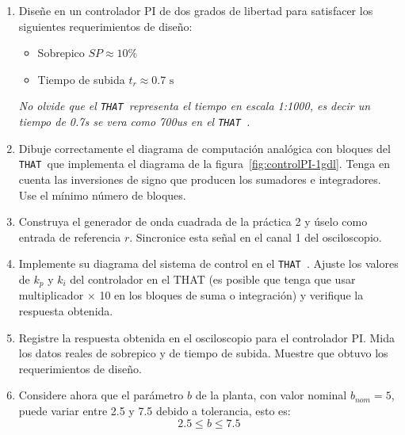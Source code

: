 \documentclass[]{scrartcl}
\newcommand{\that}[0]{\texttt{THAT~}}
\begin{document}
\begin{enumerate}
	\item Diseñe en un controlador PI de dos grados de libertad para satisfacer los siguientes requerimientos de diseño:
	\begin{itemize}
		\item Sobrepico $SP \approx 10\%$
		\item Tiempo de subida $t_{r} \approx 0.7\text{ s} $
	\end{itemize}
 \emph{No olvide que el \that representa el tiempo en escala 1:1000, es decir un tiempo de 0.7s se vera como 700us en el \that. }
	
	\item Dibuje correctamente el diagrama de computación analógica con bloques del \that que  implementa el diagrama de la figura~\ref{fig:controlPI-1gdl}. Tenga en cuenta las inversiones de signo que producen los sumadores e integradores. Use el mínimo número de bloques.
	

	
	

  \item Construya el generador de onda cuadrada de la práctica 2 y úselo como entrada de referencia $r$. Sincronice esta señal en el canal 1 del osciloscopio. 
 

 \item Implemente su diagrama del sistema de control  en el \that. Ajuste los valores de $k_p$ y $k_i$ del controlador en el THAT (es posible que tenga que usar multiplicador $\times$ 10 en los bloques de suma o integración) y verifique la respuesta obtenida.  
 
  \item Registre la respuesta obtenida en el osciloscopio para el controlador PI. Mida los datos reales de sobrepico y de tiempo de subida. Muestre que obtuvo los requerimientos de diseño.  


   \item Considere ahora que el parámetro $b$ de la planta, con valor nominal $b_{nom}=5$, puede variar  entre 2.5 y 7.5 debido a tolerancia, esto es:
   \[2.5 \leq b \leq 7.5\]
   

\end{enumerate}
\end{document}
